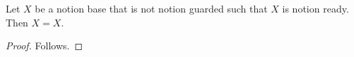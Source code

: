 

\begin{proposition}\label{notion_completed_negative}
    Let $X$ be a notion base that is not notion guarded such that
        $X$ is notion ready.
    Then $X=X$.
\end{proposition}
\begin{proof}
    Follows.
\end{proof}
